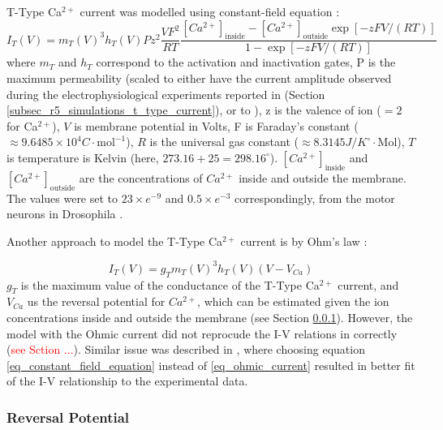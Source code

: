 \documentclass[../../workflow.tex]{subfiles}
\begin{document}
T-Type Ca$^{2+}$ current was modelled using constant-field equation \parencite{huguenardSimulationCurrentsInvolved1992}:
\begin{equation}\label{eq_constant_field_equation}
    I_T(V) = m_T(V)^3 h_T(V) P z^2 \frac{VF^2}{RT}\frac{[Ca^{2+}]_{\text{inside}} - [Ca^{2+}]_{\text{outside}} \exp{[-zFV/(RT)]} }{1 - \exp{[-zFV/(RT)]}}
\end{equation}
where $m_T$ and $h_T$ correspond to the activation and inactivation gates,
P is the maximum permeability (scaled to either have the current amplitude observed
during the electrophysiological experiments reported in \parencite{jeongCaa1TFlyTtype2015}
(Section \ref{subsec_r5_simulations_t_type_current}), or to ), z is the valence of ion ($=2$ for Ca$^{2+}$),
$V$ is membrane potential in Volts, F is Faraday's constant ($\approx 9.6485 \times 10^{4} C\cdot \text{mol}^{-1}$),
$R$ is the universal gas constant
($\approx 8.3145 J/K^\circ \cdot \text{Mol}$), $T$ is temperature is Kelvin (here, $273.16+25=298.16^{\circ}$).
$[Ca^{2+}]_{\text{inside}}$ and $[Ca^{2+}]_{\text{outside}}$ are the concentrations of $Ca^{2+}$ inside and
outside the membrane. The values were set to $23 \times e^{-9}$ and $0.5 \times e^{-3}$ correspondingly,
from the motor neurons in Drosophila
\parencite{frankenhaeuserActionCalciumElectrical1957}.

Another approach to model the T-Type Ca$^{2+}$ current is by Ohm's law \parencite{huguenardSimulationCurrentsInvolved1992, 
wangModelTtypeCalcium1991}:

\begin{equation}\label{eq_ohmic_current}
    I_T(V) = g_T m_T(V)^3 h_T(V) (V - V_{Ca})
\end{equation}
$g_T$ is the maximum value of the conductance of the T-Type
Ca$^{2+}$ current, and $V_{Ca}$ us the reversal potential for $Ca^{2+}$, which can be estimated
given the ion concentrations inside and outside the membrane (see Section \ref{subsbusec_reversal_potential}).
However, the model with the Ohmic current did not reprocude the I-V relations
in \parencite{jeongCaa1TFlyTtype2015} correctly (\textcolor{red}{see Sction ...}).
Similar issue was described in \parencite{huguenardSimulationCurrentsInvolved1992}, where choosing
equation \ref{eq_constant_field_equation} instead of \ref{eq_ohmic_current} resulted in better
fit of the I-V relationship to the experimental data.

\subsubsection{Reversal Potential}\label{subsbusec_reversal_potential}
\end{document}
